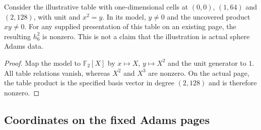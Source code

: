 \begin{lemma}
  \label{lem:adams-e2-three-cell-example}
  Consider the illustrative table with one-dimensional cells at $(0,0)$,
  $(1,64)$ and $(2,128)$, with unit and $x^2=y$.  In its model, $y\ne0$
  and the uncovered product $xy\ne0$.  For any supplied presentation of
  this table on an existing page, the resulting $h_6^2$ is nonzero.
  This is not a claim that the illustration is actual sphere Adams data.
\end{lemma}
\begin{proof}
  Map the model to $\mathbb F_2[X]$ by $x\mapsto X$, $y\mapsto X^2$
  and the unit generator to $1$.  All table relations vanish, whereas
  $X^2$ and $X^3$ are nonzero.  On the actual page, the table product is
  the specified basis vector in degree $(2,128)$ and is therefore nonzero.
\end{proof}


\subsection{Coordinates on the fixed Adams pages}

